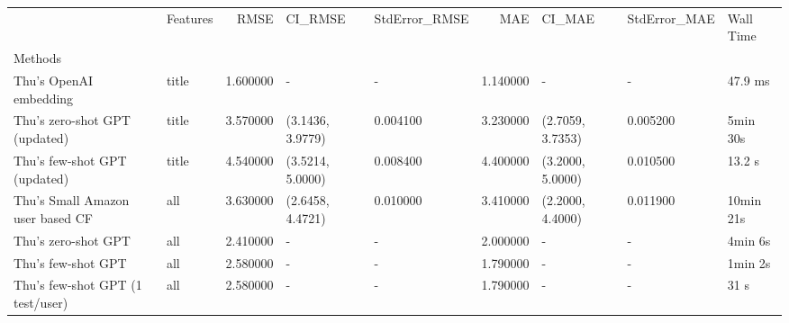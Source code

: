 \begin{tabular}{llrllrlll}
 & Features & RMSE & CI_RMSE & StdError_RMSE & MAE & CI_MAE & StdError_MAE & Wall Time \\
Methods &  &  &  &  &  &  &  &  \\
Thu's OpenAI embedding & title & 1.600000 & - & - & 1.140000 & - & - & 47.9 ms \\
Thu's zero-shot GPT (updated) & title & 3.570000 & (3.1436, 3.9779) & 0.004100 & 3.230000 & (2.7059, 3.7353) & 0.005200 & 5min 30s \\
Thu's few-shot GPT (updated) & title & 4.540000 & (3.5214, 5.0000) & 0.008400 & 4.400000 & (3.2000, 5.0000) & 0.010500 & 13.2 s \\
Thu's Small Amazon user based CF & all & 3.630000 & (2.6458, 4.4721) & 0.010000 & 3.410000 & (2.2000, 4.4000) & 0.011900 & 10min 21s \\
Thu's zero-shot GPT & all & 2.410000 & - & - & 2.000000 & - & - & 4min 6s \\
Thu's few-shot GPT & all & 2.580000 & - & - & 1.790000 & - & - & 1min 2s \\
Thu's few-shot GPT (1 test/user) & all & 2.580000 & - & - & 1.790000 & - & - & 31 s \\
\end{tabular}
